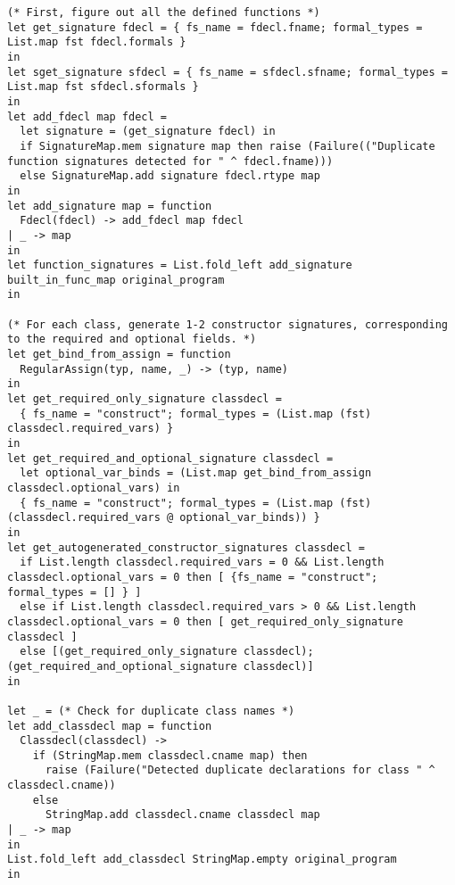 \documentclass{article}
\begin{document}
\begin{verbatim}
(* First, figure out all the defined functions *)
let get_signature fdecl = { fs_name = fdecl.fname; formal_types = List.map fst fdecl.formals }
in
let sget_signature sfdecl = { fs_name = sfdecl.sfname; formal_types = List.map fst sfdecl.sformals }
in
let add_fdecl map fdecl =
  let signature = (get_signature fdecl) in
  if SignatureMap.mem signature map then raise (Failure(("Duplicate function signatures detected for " ^ fdecl.fname)))
  else SignatureMap.add signature fdecl.rtype map
in
let add_signature map = function
  Fdecl(fdecl) -> add_fdecl map fdecl
| _ -> map
in
let function_signatures = List.fold_left add_signature built_in_func_map original_program
in

(* For each class, generate 1-2 constructor signatures, corresponding to the required and optional fields. *)
let get_bind_from_assign = function
  RegularAssign(typ, name, _) -> (typ, name)
in
let get_required_only_signature classdecl =
  { fs_name = "construct"; formal_types = (List.map (fst) classdecl.required_vars) }
in
let get_required_and_optional_signature classdecl =
  let optional_var_binds = (List.map get_bind_from_assign classdecl.optional_vars) in
  { fs_name = "construct"; formal_types = (List.map (fst) (classdecl.required_vars @ optional_var_binds)) }
in
let get_autogenerated_constructor_signatures classdecl =
  if List.length classdecl.required_vars = 0 && List.length classdecl.optional_vars = 0 then [ {fs_name = "construct"; formal_types = [] } ]
  else if List.length classdecl.required_vars > 0 && List.length classdecl.optional_vars = 0 then [ get_required_only_signature classdecl ]
  else [(get_required_only_signature classdecl); (get_required_and_optional_signature classdecl)]
in

let _ = (* Check for duplicate class names *)
let add_classdecl map = function
  Classdecl(classdecl) ->
    if (StringMap.mem classdecl.cname map) then
      raise (Failure("Detected duplicate declarations for class " ^ classdecl.cname))
    else
      StringMap.add classdecl.cname classdecl map
| _ -> map
in
List.fold_left add_classdecl StringMap.empty original_program
in


\end{verbatim}
\end{document}
